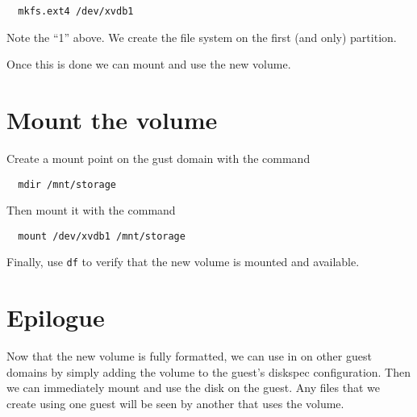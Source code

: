 \documentclass{article}
\begin{document}
\begin{verbatim}
  mkfs.ext4 /dev/xvdb1
\end{verbatim}

Note the ``1'' above. We create the file system on the first (and only) partition.

Once this is done we can mount and use the new volume.

\section{Mount the volume}
Create a mount point on the gust domain with the command

\begin{verbatim}
  mdir /mnt/storage
\end{verbatim}

Then mount it with the command

\begin{verbatim}
  mount /dev/xvdb1 /mnt/storage
\end{verbatim}

Finally, use \texttt{df} to verify that the new volume is mounted and available.

\section{Epilogue}
Now that the new volume is fully formatted, we can use in on other guest domains by simply adding the volume to the guest's diskspec configuration. Then 
we can immediately mount and use the disk on the guest. Any files that we create using one guest will be seen by another that uses the volume.
\end{document}
